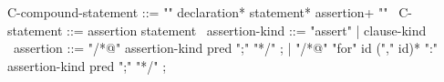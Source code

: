 \begin{syntax}
  C-compound-statement ::= "{" declaration* statement* assertion+ "}"
        \
  C-statement ::= assertion statement \
  assertion-kind ::= "assert" | clause-kind \
  assertion ::= "/*@" assertion-kind pred ";" "*/" ;
  | { "/*@" "for" id ("," id)* ":" assertion-kind pred ";" "*/" } ;
\end{syntax}
